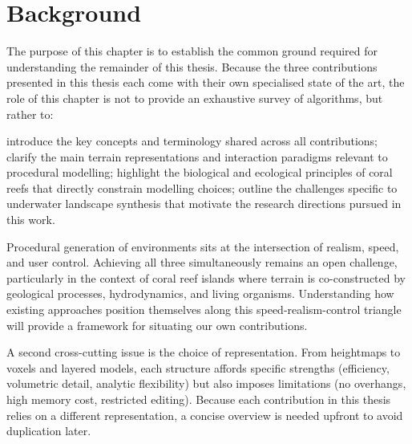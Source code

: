 \resetgraphicspath
{}

\chapter{Background}
\label{chap:background}
\minitoc

The purpose of this chapter is to establish the common ground required for understanding the remainder of this thesis. Because the three contributions presented in this thesis each come with their own specialised state of the art, the role of this chapter is not to provide an exhaustive survey of algorithms, but rather to:
\begin{Itemize}
    \Item{} introduce the key concepts and terminology shared across all contributions;
    \Item{} clarify the main terrain representations and interaction paradigms relevant to procedural modelling;
    \Item{} highlight the biological and ecological principles of coral reefs that directly constrain modelling choices;
    \Item{} outline the challenges specific to underwater landscape synthesis that motivate the research directions pursued in this work.
\end{Itemize}





Procedural generation of environments sits at the intersection of realism, speed, and user control. Achieving all three simultaneously remains an open challenge, particularly in the context of coral reef islands where terrain is co-constructed by geological processes, hydrodynamics, and living organisms. Understanding how existing approaches position themselves along this speed-realism-control triangle will provide a framework for situating our own contributions.

A second cross-cutting issue is the choice of representation. From heightmaps to voxels and layered models, each structure affords specific strengths (efficiency, volumetric detail, analytic flexibility) but also imposes limitations (no overhangs, high memory cost, restricted editing). Because each contribution in this thesis relies on a different representation, a concise overview is needed upfront to avoid duplication later.


